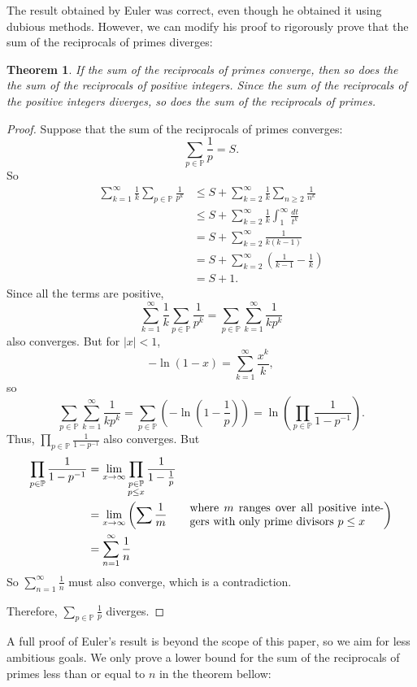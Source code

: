 \documentclass[a4paper]{article}
\newtheorem{theorem}{Theorem}[section]
\theoremstyle{definition}
\theoremstyle{remark}
\begin{document}
The result obtained by Euler was correct, even though he obtained it using dubious methods. However, we can modify his proof to rigorously prove that the sum of the reciprocals of primes diverges:
\begin{theorem}
  If the sum of the reciprocals of primes converge, then so does the the sum of the reciprocals of positive integers. Since the sum of the reciprocals of the positive integers diverges, so does the sum of the reciprocals of primes.
  \label{thm:reciprocalPrimeDiverge}
\end{theorem}
\begin{proof}
  Suppose that the sum of the reciprocals of primes converges:
  \[
  \sum_{p\in\mathbb{P}}\frac{1}{p}=S
  .
  \]
  So
  \begin{align*}
    \sum_{k=1}^\infty\frac{1}{k}\sum_{p\in\mathbb{P}}\frac{1}{p^k}&\le S + \sum_{k=2}^\infty\frac{1}{k}\sum_{n\ge2}\frac{1}{n^k}\\
    &\le S+\sum_{k=2}^\infty\frac{1}{k}\int_1^\infty\frac{dt}{t^k}\\
    &=S+\sum_{k=2}^\infty\frac{1}{k(k-1)}\\
    &=S+\sum_{k=2}^\infty\left( \frac{1}{k-1}-\frac{1}{k} \right)\\
    &=S+1
    .
  \end{align*}
  Since all the terms are positive, 
  \[
  \displaystyle\sum_{k=1}^\infty\frac{1}{k}\sum_{p\in\mathbb{P}}\frac{1}{p^k}=\sum_{p\in\mathbb{P}}\sum_{k=1}^\infty\frac{1}{kp^k}
  \]
  also converges. But for $|x|<1$, 
  \[
  -\ln(1-x)=\sum_{k=1}^\infty\frac{x^k}{k}
  ,
  \]
  so
  \[
  \sum_{p\in\mathbb{P}}\sum_{k=1}^\infty\frac{1}{kp^k}=\sum_{p\in\mathbb{P}}\left( -\ln\left( 1-\frac{1}{p} \right) \right)=\ln\left( \prod_{p\in\mathbb{P}}\frac{1}{1-p^{-1}} \right)
  .
  \]
  Thus, $\displaystyle\prod_{p\in\mathbb{P}}\frac{1}{1-p^{-1}}$ also converges. But
  \begin{align*}
    \prod_{p\in\mathbb{P}}\frac{1}{1-p^{-1}}&=\lim_{x\to\infty}\prod\limits_{\substack{p\in\mathbb{P}\\p\le x}}\frac{1}{1-\frac{1}{p}}\\
    &=\lim_{x\to\infty}\left( \sum\frac{1}{m}\qquad\parbox{6cm}{where $m$ ranges over all positive integers with only prime divisors $p\le x$} \right)\\
    &=\sum_{n=1}^\infty\frac{1}{n}
  \end{align*}
  So $\displaystyle\sum_{n=1}^\infty\frac{1}{n}$ must also converge, which is a contradiction.

  Therefore, $\displaystyle\sum_{p\in\mathbb{P}}\frac{1}{p}$ diverges.
\end{proof}
A full proof of Euler's result is beyond the scope of this paper, so we aim for less ambitious goals. We only prove a lower bound for the sum of the reciprocals of primes less than or equal to $n$ in the theorem bellow:
\end{document}
